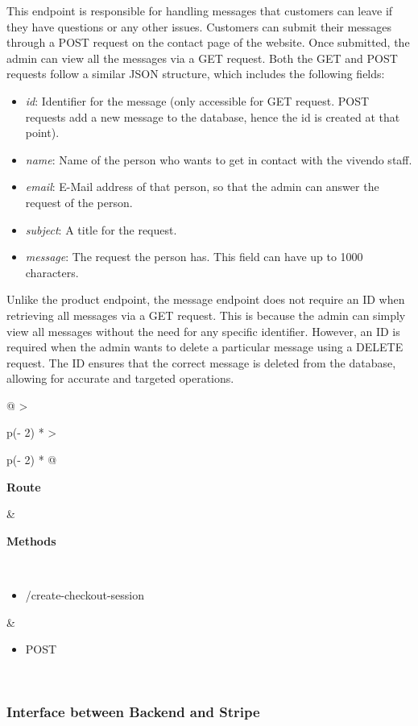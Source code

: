 This endpoint is responsible for handling messages that customers can leave if they have questions or any other issues. Customers can submit their messages through a POST request on the contact page of the website. Once submitted, the admin can view all the messages via a GET request. Both the GET and POST requests follow a similar JSON structure, which includes the following fields:

\begin{itemize}
    \item \textit{id}: Identifier for the message (only accessible for GET request. POST requests add a new message to the database, hence the id is created at that point).
    \item \textit{name}: Name of the person who wants to get in contact with the vivendo staff.
    \item \textit{email}: E-Mail address of that person, so that the admin can answer the request of the person.
    \item \textit{subject}: A title for the request.
    \item \textit{message}: The request the person has. This field can have up to 1000 characters.
\end{itemize}

Unlike the product endpoint, the message endpoint does not require an ID when retrieving all messages via a GET request. This is because the admin can simply view all messages without the need for any specific identifier. However, an ID is required when the admin wants to delete a particular message using a DELETE request. The ID ensures that the correct message is deleted from the database, allowing for accurate and targeted operations.

\begin{longtable}[]{@{}
    >{\raggedright\arraybackslash}p{(\columnwidth - 2\tabcolsep) * }
    >{\raggedright\arraybackslash}p{(\columnwidth - 2\tabcolsep) * }@{}}
\toprule
\begin{minipage}[b]{\linewidth}\raggedright
\textbf{Route}
\end{minipage} & \begin{minipage}[b]{\linewidth}\raggedright
\textbf{Methods}
\end{minipage} \\
\midrule
\endhead
\begin{itemize}
    \item /create-checkout-session
\end{itemize} &
\begin{itemize}
    \item POST
\end{itemize} \\
\bottomrule
\end{longtable}


\subsubsection{Interface between Backend and Stripe}

